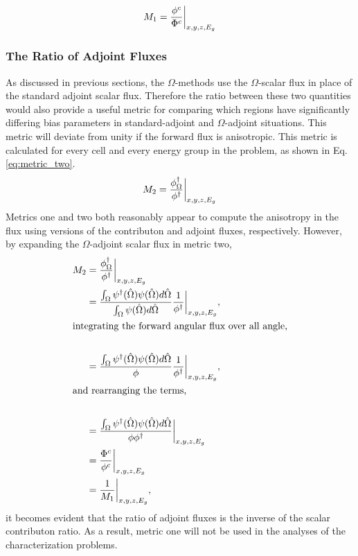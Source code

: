 \begin{equation}
  M_{1} = \frac{\phi^{c}}{\Phi^{c}}\bigg\rvert_{x,y,z,E_g}
  \label{eq:metric_one}
\end{equation}

\subsubsection{The Ratio of Adjoint Fluxes}

As discussed in previous sections, the $\Omega$-methods use the $\Omega$-scalar
flux in place of the standard adjoint scalar flux. Therefore the ratio between
these two quantities would also provide a useful metric for comparing which
regions have significantly differing bias parameters in standard-adjoint and
$\Omega$-adjoint situations. This metric will deviate from unity if the forward
flux is anisotropic. This metric is calculated for
every cell and every energy group in the problem, as shown in Eq.
\eqref{eq:metric_two}.
%
\begin{equation}
  M_{2} = \frac{\phi^{\dagger}_{\Omega}}{\phi^{\dagger}}\bigg\rvert_{x,y,z,E_g}
  \label{eq:metric_two}
\end{equation}
%
Metrics one and two both reasonably appear to compute the anisotropy in the flux
using versions of the contributon and adjoint fluxes, respectively. However, by
expanding the $\Omega$-adjoint scalar flux in metric two,
%
\begin{align*}
  M_{2} & = \frac{\phi^{\dagger}_{\Omega}}{\phi^{\dagger}}\bigg\rvert_{x,y,z,E_g} \\
  & = \frac{\int_{\Omega}{\psi^{\dagger}(\hat\Omega) \psi(\hat\Omega)}
      d\hat{\Omega}}{\int_{\Omega}{\psi(\hat\Omega) d\hat{\Omega}}}
           \frac{1}{\phi^{\dagger}}\bigg\rvert_{x,y,z,E_g}, \\
\intertext{integrating the forward angular flux over all angle,} \\
  & = \frac{\int_{\Omega}{\psi^{\dagger}(\hat\Omega) \psi(\hat\Omega)}
      d\hat{\Omega}}{\phi}
           \frac{1}{\phi^{\dagger}}\bigg\rvert_{x,y,z,E_g}, \\
\intertext{and rearranging the terms,}\\
  & = \frac{\int_{\Omega}{\psi^{\dagger}(\hat\Omega) \psi(\hat\Omega)}
      d\hat{\Omega}}{\phi \phi^{\dagger}}\bigg\rvert_{x,y,z,E_g}\\
  & = \frac{\Phi^{c}}{\phi^{c}}\bigg\rvert_{x,y,z,E_g}\\
  & = \frac{1}{M_{1}}\bigg\rvert_{x,y,z,E_g},
\end{align*}
%
it becomes evident that the ratio of adjoint fluxes is the inverse of the scalar
contributon ratio. As a result, metric one will not be used in the analyses of
the characterization problems.



